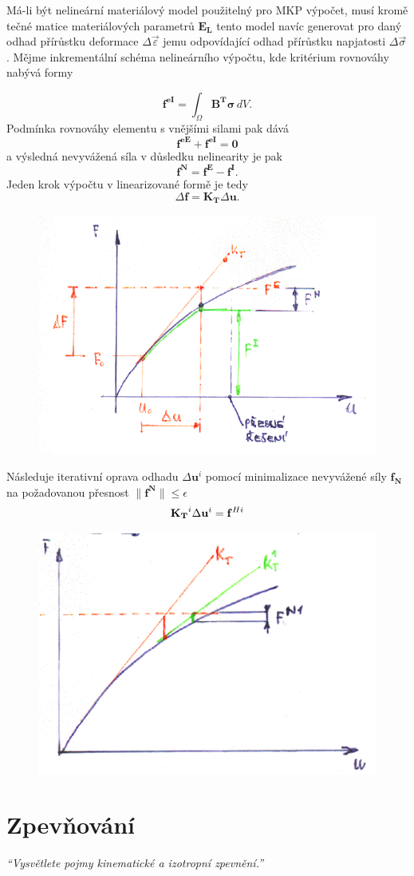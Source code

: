 \documentclass{article}
\begin{document}
	Má-li být nelineární materiálový model použitelný pro MKP výpočet, musí kromě tečné matice materiálových parametrů $\mathbf{E_L}$ tento model navíc generovat pro daný odhad přírůstku deformace $\Delta\vec{\varepsilon}$ jemu odpovídající odhad přírůstku napjatosti $\Delta\vec{\sigma}$. Mějme inkrementální schéma nelineárního výpočtu, kde kritérium rovnováhy nabývá formy
	
	$$\mathbf{f^{eI}} = \int_{\Omega}\mathbf{B^T}\bm{\sigma}\,dV.$$
	Podmínka rovnováhy elementu s vnějšími silami pak dává
	$$\mathbf{f^{eE} + f^{eI} = 0}$$
	a výsledná nevyvážená síla v důsledku nelinearity je pak
	$$\mathbf{f^N = f^E - f^I}.$$
	Jeden krok výpočtu v linearizované formě je tedy
	$$\Delta\mathbf{f = K_T}\Delta\mathbf{u}.$$
	\begin{figure}[h!]
		\centering
		\includegraphics[width=.6\linewidth]{figs/7_1.png}
	\end{figure}

	Následuje iterativní oprava odhadu $\Delta\mathbf{u}^i$ pomocí minimalizace nevyvážené síly $\mathbf{f_N}$ na požadovanou přesnost $\lVert \mathbf{f^N}\rVert\leq\epsilon$
	$$\mathbf{K_T}^{\mathnormal{i}}\Delta\mathbf{u}^i = \mathbf{f}^{Hi}$$
	\begin{figure}[h!]
		\centering
		\includegraphics[width=.5\linewidth]{figs/7_2.png}
	\end{figure}

	\section{Zpevňování}
	\emph{``Vysvětlete pojmy kinematické a izotropní zpevnění.''}
\end{document}
